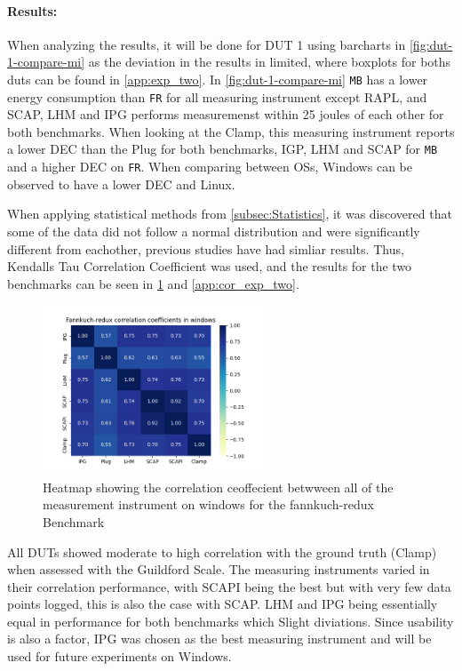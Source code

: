 

\paragraph{Results:} When analyzing the results, it will be done for DUT 1 using barcharts in \cref{fig:dut-1-compare-mi} as the deviation in the results in limited, where boxplots for boths duts can be found in \cref{app:exp_two}. In \cref{fig:dut-1-compare-mi} \texttt{MB} has a lower energy consumption than \texttt{FR} for all measuring instrument except RAPL, and SCAP, LHM and IPG performs measuremenst within 25 joules of each other for both benchmarks. When looking at the Clamp, this measuring instrument reports a lower DEC than the Plug for both benchmarks, IGP, LHM and SCAP for \texttt{MB} and a higher DEC on \texttt{FR}. When comparing between OSs, Windows can be observed to have a lower DEC and Linux.



When applying statistical methods from \cref{subsec:Statistics}, it was discovered that some of the data did not follow a normal distribution and were significantly different from eachother, previous studies \cite{biksbois, Koedijk2022diff} have had simliar results. Thus, Kendalls Tau Correlation Coefficient was used, and the results for the two benchmarks can be seen in \cref{fig:fannkuchCorr} and \cref{app:cor_exp_two}.

\begin{figure}[H]
    \centering
    \hspace*{-1cm} %
    \includegraphics[width=0.6\textwidth]{figures/Fannkuch-redux_ex2.png}
    \caption{Heatmap showing the correlation ceoffecient betwween all of the measurement instrument on windows for the fannkuch-redux Benchmark}
    \label{fig:fannkuchCorr}
\end{figure}


All DUTs showed moderate to high correlation with the ground truth (Clamp) when assessed with the Guildford Scale. The measuring instruments varied in their correlation performance, with SCAPI being the best but with very few data points logged, this is also the case with SCAP. LHM and IPG being essentially equal in performance for both benchmarks which Slight diviations. Since usability is also a factor, IPG was chosen as the best measuring instrument and will be used for future experiments on Windows.


